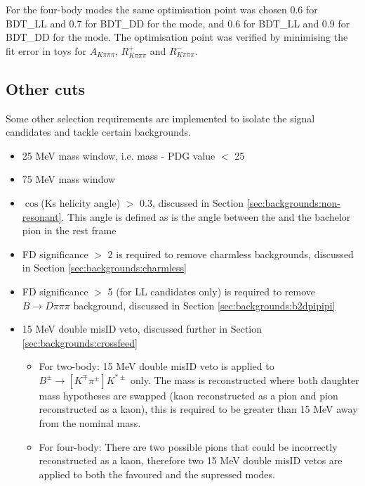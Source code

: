 For the four-body modes the same optimisation point was chosen 0.6 for BDT\_LL and 0.7 for BDT\_DD for the \decay{\Dz}{\Kp\pim\pip\pim} \decay{\Dz}{\pi\pi\pi\pi} mode, and 0.6 for BDT\_LL and 0.9 for BDT\_DD for the \decay{\Dz}{\Kp\pim\pip\pim} mode. The optimisation point was verified by minimising the fit error in toys for $A_{K\pi\pi\pi}$, $R^+_{K\pi\pi\pi}$ and $R^-_{K\pi\pi\pi}$.


\subsection{Other cuts}

Some other selection requirements are implemented to isolate the signal candidates and tackle certain backgrounds.

\begin{itemize}
\item 25 MeV \Dz mass window, i.e. \textbar \Dz mass - PDG value \textbar $<$ 25 \mev
\item 75 MeV \Kstarm mass window
\item{\textbar $\cos$(Ks helicity angle) \textbar $>$ 0.3, discussed in Section \ref{sec:backgrounds:non-resonant}. This angle is defined as is the angle between the \KS and the bachelor pion in the \Kstarm rest frame}
\item{\Dz FD significance $>$ 2 is required to remove charmless backgrounds, discussed in Section \ref{sec:backgrounds:charmless}}
\item{\KS FD significance $>$ 5 (for LL candidates only) is required to remove $B \to D\pi\pi\pi$ background, discussed in Section \ref{sec:backgrounds:b2dpipipi}}
\item{15 MeV double misID veto, discussed further in Section \ref{sec:backgrounds:crossfeed}}
\begin{itemize}
\item For two-body: 15 MeV double misID veto is applied to $B^{\pm} \to [K^{\mp}\pi^{\pm}] K^{*\pm}$ only. The \Dz mass is reconstructed where both daughter mass hypotheses are swapped (kaon reconstructed as a pion and pion reconstructed as a kaon), this is required to be greater than 15 MeV away from the nominal \Dz mass.
\item For four-body: There are two possible pions that could be incorrectly reconstructed as a kaon, therefore two 15 MeV double misID vetos are applied to both the favoured and the supressed modes. 
\end{itemize} 
\end{itemize}


